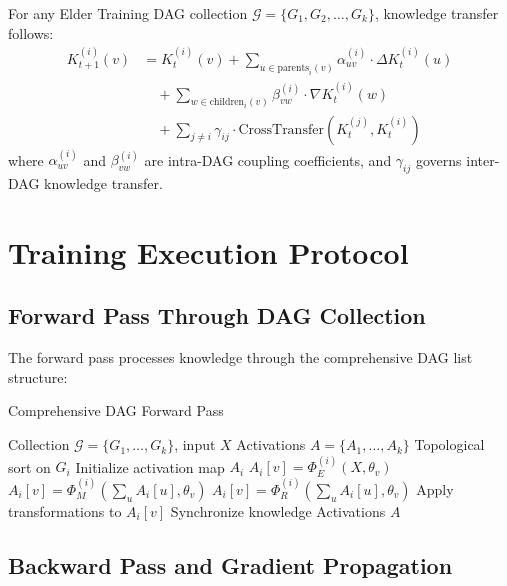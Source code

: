 \begin{theorem}
For any Elder Training DAG collection $\mathcal{G} = \{G_1, G_2, \ldots, G_k\}$, knowledge transfer follows:
\begin{align}
K_{t+1}^{(i)}(v) &= K_t^{(i)}(v) + \sum_{u \in \text{parents}_i(v)} \alpha_{uv}^{(i)} \cdot \Delta K_t^{(i)}(u) \\
&\quad + \sum_{w \in \text{children}_i(v)} \beta_{vw}^{(i)} \cdot \nabla K_t^{(i)}(w) \\
&\quad + \sum_{j \neq i} \gamma_{ij} \cdot \text{CrossTransfer}(K_t^{(j)}, K_t^{(i)})
\end{align}
where $\alpha_{uv}^{(i)}$ and $\beta_{vw}^{(i)}$ are intra-DAG coupling coefficients, and $\gamma_{ij}$ governs inter-DAG knowledge transfer.
\end{theorem}

\section{Training Execution Protocol}

\subsection{Forward Pass Through DAG Collection}

The forward pass processes knowledge through the comprehensive DAG list structure:

\begin{algorithm}[H]
\caption{Comprehensive DAG Forward Pass}
\begin{algorithmic}[1]
\REQUIRE Collection $\mathcal{G} = \{G_1, \ldots, G_k\}$, input $X$
\ENSURE Activations $A = \{A_1, \ldots, A_k\}$
    \STATE Topological sort on $G_i$
    \STATE Initialize activation map $A_i$
            \STATE $A_i[v] = \Phi_E^{(i)}(X, \theta_v)$
            \STATE $A_i[v] = \Phi_M^{(i)}(\sum_u A_i[u], \theta_v)$
            \STATE $A_i[v] = \Phi_R^{(i)}(\sum_u A_i[u], \theta_v)$
        \ENDIF
        \STATE Apply transformations to $A_i[v]$
    \ENDFOR
\ENDFOR
\STATE Synchronize knowledge
\RETURN Activations $A$
\end{algorithmic}
\end{algorithm}

\subsection{Backward Pass and Gradient Propagation}

